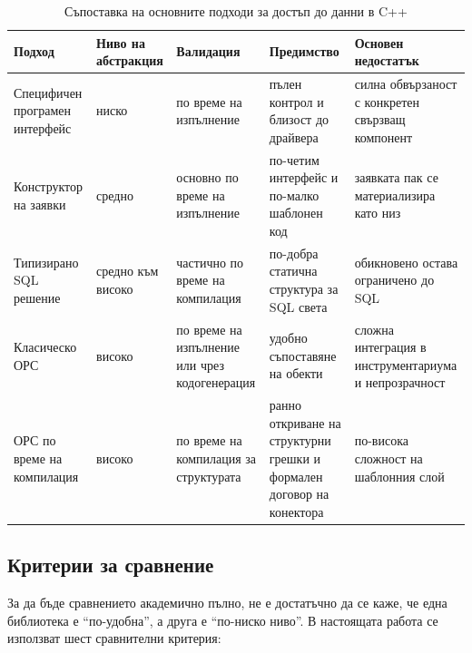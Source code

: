 \begin{table}[H]
\centering
\caption{Съпоставка на основните подходи за достъп до данни в C++}
\label{tab:existing_solutions_comparison}
\begin{tabular}{L{3.2cm}L{2.5cm}L{2.7cm}L{2.9cm}L{2.8cm}}
\toprule
\textbf{Подход} & \textbf{Ниво на абстракция} & \textbf{Валидация} & \textbf{Предимство} & \textbf{Основен недостатък} \\
\midrule
Специфичен програмен интерфейс & ниско & по време на изпълнение & пълен контрол и близост до драйвера & силна обвързаност с конкретен свързващ компонент \\
Конструктор на заявки & средно & основно по време на изпълнение & по-четим интерфейс и по-малко шаблонен код & заявката пак се материализира като низ \\
Типизирано SQL решение & средно към високо & частично по време на компилация & по-добра статична структура за SQL света & обикновено остава ограничено до SQL \\
Класическо ОРС & високо & по време на изпълнение или чрез кодогенерация & удобно съпоставяне на обекти & сложна интеграция в инструментариума и непрозрачност \\
ОРС по време на компилация & високо & по време на компилация за структурата & ранно откриване на структурни грешки и формален договор на конектора & по-висока сложност на шаблонния слой \\
\bottomrule
\end{tabular}
\end{table}

\subsection{Критерии за сравнение}

За да бъде сравнението академично пълно, не е достатъчно да се каже, че една библиотека е ``по-удобна'', а друга е ``по-ниско ниво''. В настоящата работа се използват шест сравнителни критерия:


